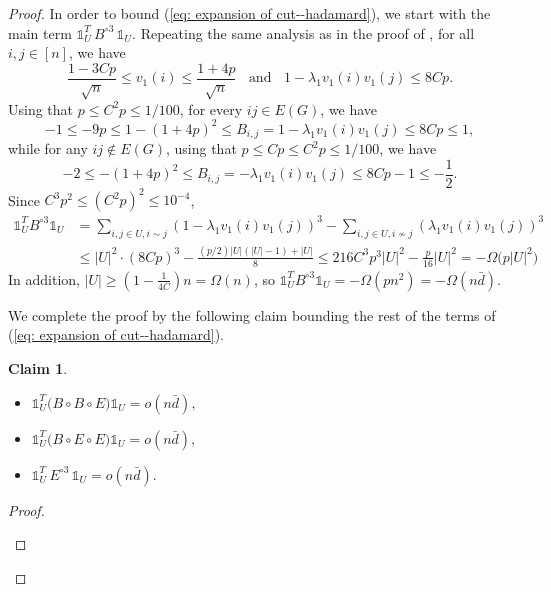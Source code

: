 \documentclass[11pt]{article}
\theoremstyle{plain}
\newtheorem{claim}[theorem]{Claim}
\theoremstyle{definition}
\begin{document}
\begin{proof}
    In order to bound (\ref{eq: expansion of cut--hadamard}), we start with the main term $\mathds{1}_U^T \,B^{\circ 3}\, \mathds{1}_U$.
    Repeating the same analysis as in the proof of , for all $i,j \in [n]$, we have 
    $$\frac{1-3Cp}{\sqrt{n}} \le v_1(i) \le \frac{1+4p}{\sqrt{n}}\;\;\text{ and }\;\;
        1 - \lambda_1v_1(i)v_1(j) \le 8Cp.$$
    Using that $p \le C^2p \le 1/100$, for every  $ij \in E(G)$, we have 
    $$ -1 \le -9p \le 1-(1+4p)^2\le B_{i,j} = 1-\lambda_1v_1(i)v_1(j) \le 8Cp \le 1,$$
    while for any $ij \not\in E(G)$, using that $p \le Cp \le C^2p \le 1/100$, we have 
    $$-2 \le -(1+4p)^2\le B_{i,j} = -\lambda_1v_1(i)v_1(j) \le 8Cp - 1 \le -\frac{1}{2}.$$
    Since $C^3p^2 \le (C^2p)^2 \le 10^{-4}$, 
    \begin{equation}    \nonumber
      \begin{aligned}
        \mathds{1}^T_U B^{\circ 3}\mathds{1}_U
        &= \sum_{i,j\in U,i \sim j} (1-\lambda_1v_1(i)v_1(j))^3 - \sum_{i,j\in U,i\not\sim j}(\lambda_1v_1(i)v_1(j))^3 \\
        &\le |U|^2 \cdot (8Cp)^3 - \frac{(p/2)|U|(|U|-1)+|U|}{8}
        \le 216C^3p^3|U|^2-\frac{p}{16}|U|^2
        = -\Omega\big(p|U|^2\big)
      \end{aligned}
    \end{equation}
    In addition, $|U| \ge (1-\frac{1}{4C})n =\Omega(n)$, so $\mathds{1}^T_U B^{\circ 3}\mathds{1}_U= -\Omega(pn^2)=-\Omega(n\bar{d})$.
    
    We complete the proof by the following claim bounding the rest of the terms of (\ref{eq: expansion of cut--hadamard}).
    \begin{claim}
    \begin{itemize}
        \item[(1)] $\mathds{1}_U^T\big(B\circ B\circ E\big)\mathds{1}_U=o(n\bar{d}),$
        \item[(2)] $\mathds{1}_U^T\big(B\circ E\circ E\big)\mathds{1}_U=o(n\bar{d}),$
        \item[(3)] $\mathds{1}_U^T\,E^{\circ 3}\,\mathds{1}_U=o(n\bar{d}).$
        \end{itemize}
    \end{claim}
    
    \begin{proof}
    
        \begin{itemize}


\end{itemize}
\end{proof}
\end{proof}
\end{document}

